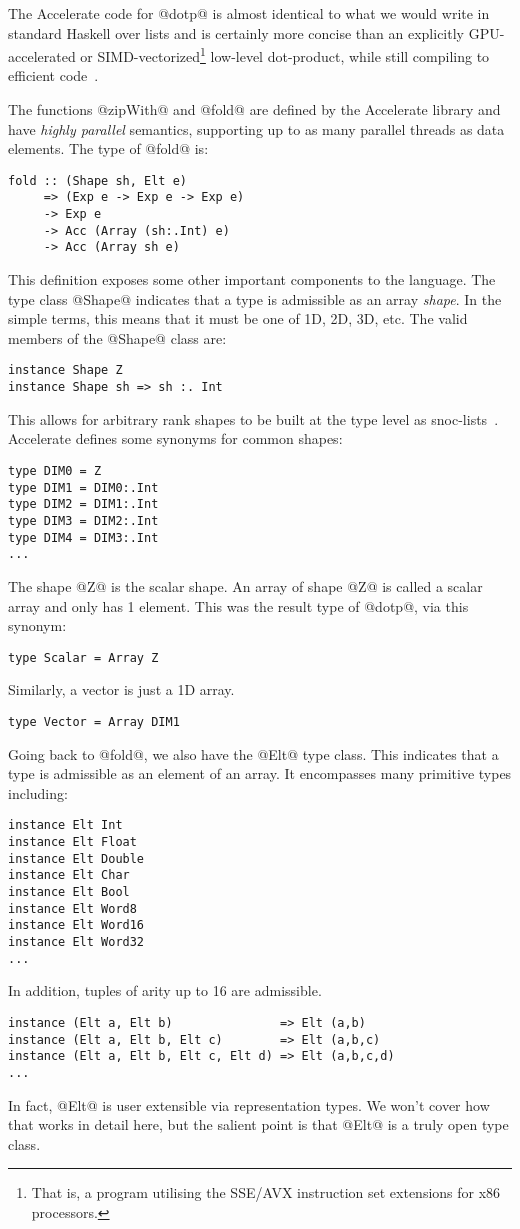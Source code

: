 The Accelerate code for @dotp@ is almost identical to what we would write in standard Haskell over lists and is certainly more concise than an explicitly GPU-accelerated or SIMD-vectorized\footnote{That is, a program utilising the SSE/AVX instruction set extensions for x86 processors.} low-level dot-product, while still compiling to efficient code~\citep{Chakravarty:acc-cuda,McDonell:acc-optim,McDonell:2015:acc-llvm}.

The functions @zipWith@ and @fold@ are defined by the Accelerate library and have \emph{highly parallel} semantics, supporting up to as many parallel threads as data elements. The type of @fold@ is:
%
\begin{lstlisting}
fold :: (Shape sh, Elt e)
     => (Exp e -> Exp e -> Exp e)
     -> Exp e
     -> Acc (Array (sh:.Int) e)
     -> Acc (Array sh e)
\end{lstlisting}
%
This definition exposes some other important components to the language. The type class @Shape@ indicates that a type is admissible as an array \emph{shape}. In the simple terms, this means that it must be one of 1D, 2D, 3D, etc. The valid members of the @Shape@ class are:
%
\begin{lstlisting}
instance Shape Z
instance Shape sh => sh :. Int
\end{lstlisting}
%
This allows for arbitrary rank shapes to be built at the type level as snoc-lists~\citep{Keller:Repa,Chakravarty:acc-cuda}. Accelerate defines some synonyms for common shapes:
%
\begin{lstlisting}
type DIM0 = Z
type DIM1 = DIM0:.Int
type DIM2 = DIM1:.Int
type DIM3 = DIM2:.Int
type DIM4 = DIM3:.Int
...
\end{lstlisting}
%
The shape @Z@ is the scalar shape. An array of shape @Z@ is called a scalar array and only has 1 element. This was the result type of @dotp@, via this synonym:
%
\begin{lstlisting}
type Scalar = Array Z
\end{lstlisting}
%
Similarly, a vector is just a 1D array.
%
\begin{lstlisting}
type Vector = Array DIM1
\end{lstlisting}
%

Going back to @fold@, we also have the @Elt@ type class. This indicates that a type is admissible as an element of an array. It encompasses many primitive types including:
%
\begin{lstlisting}
instance Elt Int
instance Elt Float
instance Elt Double
instance Elt Char
instance Elt Bool
instance Elt Word8
instance Elt Word16
instance Elt Word32
...
\end{lstlisting}
%
In addition, tuples of arity up to 16 are admissible.
%
\begin{lstlisting}
instance (Elt a, Elt b)               => Elt (a,b)
instance (Elt a, Elt b, Elt c)        => Elt (a,b,c)
instance (Elt a, Elt b, Elt c, Elt d) => Elt (a,b,c,d)
...
\end{lstlisting}
%
In fact, @Elt@ is user extensible via representation types. We won't cover how that works in detail here, but the salient point is that @Elt@ is a truly open type class.

